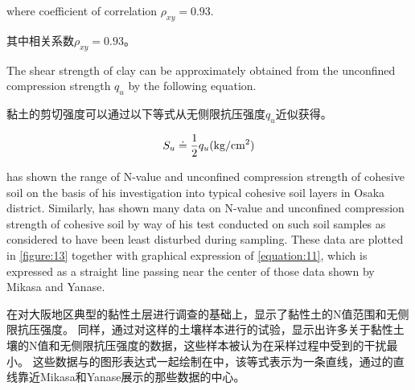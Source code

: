 \begin{paracol}{2}

    \noindent{}where coefficient of correlation $\rho_{xy}=0.93$.

    \switchcolumn      
     
    \noindent{}其中相关系数$\rho_{xy}=0.93$。

\end{paracol}


\begin{paracol}{2}
    

    The shear strength of clay can be approximately obtained from the unconfined compression strength $q_u$ by the following equation.

    \switchcolumn

    黏土的剪切强度可以通过以下等式从无侧限抗压强度$q_u$近似获得。

\end{paracol}

\begin{align}
    S_u\doteq\frac{1}{2}q_u(\rm{kg/cm^2})
\end{align}

\begin{paracol}{2}

    \citet{Mikasa197138} has shown the range of N-value and unconfined compression strength of cohesive soil on the basis of his investigation into typical cohesive soil layers in Osaka district. Similarly, \citet{Yanase196937} has shown many data on N-value and unconfined compression strength of cohesive soil by way of his test conducted on such soil samples as considered to have been least disturbed during sampling. These data are plotted in \autoref{figure:13} together with graphical expression of \autoref{equation:11}, which is expressed as a straight line passing near the center of those data shown by Mikasa\citet{Mikasa197138} and Yanase\citet{Yanase196937}.

    \switchcolumn

    \citet{Mikasa197138}在对大阪地区典型的黏性土层进行调查的基础上，显示了黏性土的N值范围和无侧限抗压强度。 同样，\citet{Yanase196937}通过对这样的土壤样本进行的试验，显示出许多关于黏性土壤的N值和无侧限抗压强度的数据，这些样本被认为在采样过程中受到的干扰最小。 这些数据与的图形表达式一起绘制在中，该等式表示为一条直线，通过的直线靠近Mikasa\citet{Mikasa197138}和Yanase\citet{Yanase196937}展示的那些数据的中心。

\end{paracol}